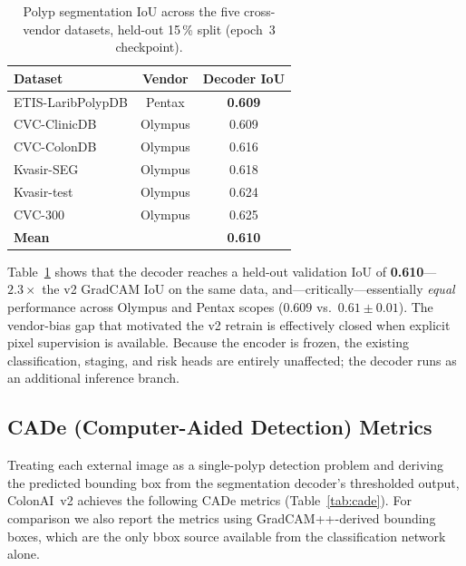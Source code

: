 \documentclass[conference]{IEEEtran}
\begin{document}
\begin{table}[h]
\centering\small
\caption{Polyp segmentation IoU across the five cross-vendor datasets,
         held-out 15\,\% split (epoch~3 checkpoint).}
\label{tab:seg_iou}
\begin{tabular}{lcc}
\hline
\textbf{Dataset} & \textbf{Vendor} & \textbf{Decoder IoU} \\
\hline
ETIS-LaribPolypDB & Pentax  & \textbf{0.609} \\
CVC-ClinicDB      & Olympus & 0.609 \\
CVC-ColonDB       & Olympus & 0.616 \\
Kvasir-SEG        & Olympus & 0.618 \\
Kvasir-test       & Olympus & 0.624 \\
CVC-300           & Olympus & 0.625 \\
\hline
\textbf{Mean}     &         & \textbf{0.610} \\
\hline
\end{tabular}
\end{table}

Table~\ref{tab:seg_iou} shows that the decoder reaches a held-out
validation IoU of \textbf{0.610}---$2.3{\times}$ the v2 GradCAM IoU on
the same data, and---critically---essentially \emph{equal} performance
across Olympus and Pentax scopes ($0.609$ vs.\ $0.61\!\pm\!0.01$). The
vendor-bias gap that motivated the v2 retrain is effectively closed when
explicit pixel supervision is available. Because the encoder is frozen,
the existing classification, staging, and risk heads are entirely
unaffected; the decoder runs as an additional inference branch.

\subsection{CADe (Computer-Aided Detection) Metrics}

Treating each external image as a single-polyp detection problem and
deriving the predicted bounding box from the segmentation decoder's
thresholded output, ColonAI~v2 achieves the following CADe metrics
(Table~\ref{tab:cade}). For comparison we also report the metrics
using GradCAM++-derived bounding boxes, which are the only bbox source
available from the classification network alone.
\end{document}
